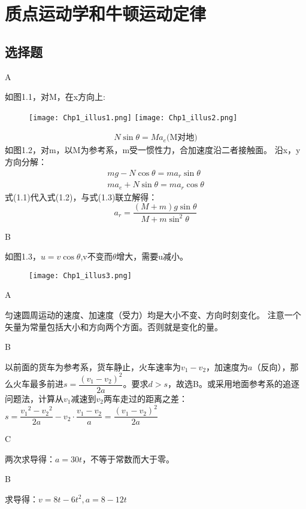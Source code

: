 \documentclass[b5paper,opensource]{./template/qyxf-book}
\begin{document}
\chapter{质点运动学和牛顿运动定律}
\section{选择题}

A

\solve
如图1.1，对M，在x方向上:
\begin{figure}[htbp]
	\centering
	\texttt{[image: Chp1\_illus1.png]}
	\quad
	\centering
	\texttt{[image: Chp1\_illus2.png]}
\end{figure}
\begin{gather}
	N\sin\theta=Ma_e\text{(M对地)}
\end{gather}
如图1.2，对m，以M为参考系，m受一惯性力，合加速度沿二者接触面。
沿x，y方向分解：
\begin{gather}
	mg-N\cos\theta=ma_r\sin\theta\\
	ma_e+N\sin\theta=ma_r\cos\theta
\end{gather}
式(1.1)代入式(1.2)，与式(1.3)联立解得：
\[
	a_r=\dfrac{(M+m)g\sin\theta}{M+m{\sin^2\theta}}
\]

B

\solve
如图1.3，$u=v\cos\theta$,v不变而$\theta$增大，需要u减小。\\
\begin{figure}[htbp]
	\centering
	\texttt{[image: Chp1\_illus3.png]}
\end{figure}

A

\solve
匀速圆周运动的速度、加速度（受力）均是大小不变、方向时刻变化。
注意一个矢量为常量包括大小和方向两个方面。否则就是变化的量。

B

\solve
以前面的货车为参考系，货车静止，火车速率为$v_1-v_2$，加速度为$a$（反向），那么火车最多前进$s=\dfrac{{(v_1-v_2)}^2}{2a}$。要求$d>s$，故选B。或采用地面参考系的追逐问题法，计算从$v_1\text{减速到}v_2$两车走过的距离之差：$s=\dfrac{{v_1}^2-{v_2}^2}{2a}-v_2\cdot \dfrac{v_1-v_2}{a}=\dfrac{{(v_1-v_2)}^2}{2a}$

C

\solve
两次求导得：$a=30t$，不等于常数而大于零。

B

\solve
求导得：$v=8t-6t^2,a=8-12t$
\end{document}
